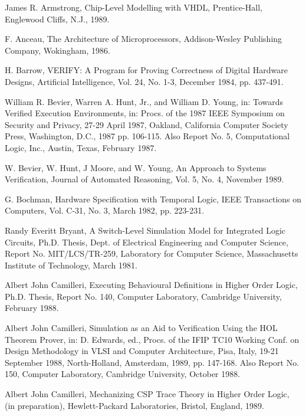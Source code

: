 \begin{thebibliography}{99}

James R. Armstrong,
Chip-Level Modelling with VHDL,
Prentice-Hall,
Englewood Cliffs, N.J.,
1989.

F. Anceau,
The Architecture of Microprocessors,
Addison-Wesley Publishing Company, Wokingham, 1986.

H. Barrow,
VERIFY:  A Program for Proving Correctness of Digital Hardware Designs,
Artificial Intelligence, Vol. 24, No. 1-3,
December 1984,
pp. 437-491.

William R. Bevier, Warren A. Hunt, Jr., and William D. Young, in:
Towards Verified Execution Environments, in:
Procs. of the 1987 IEEE Symposium on Security and Privacy,
27-29 April 1987, Oakland, California
Computer Society Press, Washington, D.C., 1987
pp. 106-115.
Also Report No. 5, Computational Logic, Inc.,
Austin, Texas,
February 1987.

W. Bevier, W. Hunt, J Moore, and W. Young,
An Approach to Systems Verification,
Journal of Automated Reasoning,
Vol. 5, No. 4, November 1989.

G. Bochman,
Hardware Specification with Temporal Logic,
IEEE Transactions on Computers,
Vol. C-31, No. 3,
March 1982,
pp. 223-231.

Randy Everitt Bryant,
A Switch-Level Simulation Model for Integrated Logic Circuits,
Ph.D. Thesis,
Dept. of Electrical Engineering and Computer Science,
Report No. MIT/LCS/TR-259,
Laboratory for Computer Science,
Massachusetts Institute of Technology,
March 1981.

Albert John Camilleri,
Executing Behavioural Definitions in Higher Order Logic,
Ph.D. Thesis,
Report No. 140,
Computer Laboratory, Cambridge University,
February 1988.

Albert John Camilleri,
Simulation as an Aid to Verification Using the HOL Theorem Prover, in:
D. Edwards, ed.,
Procs. of the IFIP TC10 Working Conf. on
Design Methodology in VLSI and Computer Architecture,
Pisa, Italy, 19-21 September 1988,
North-Holland, Amsterdam, 1989,
pp. 147-168.
Also Report No. 150,
Computer Laboratory, Cambridge University,
October 1988.

Albert John Camilleri,
Mechanizing CSP Trace Theory in Higher Order Logic,
(in preparation),
Hewlett-Packard Laboratories,
Bristol, England,
1989.


\end{thebibliography}
